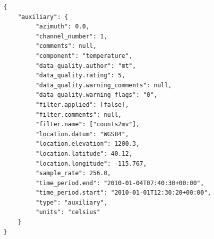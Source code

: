 \documentclass{article}
\begin{document}
\begin{verbatim}
{
    "auxiliary": {
         "azimuth": 0.0,
         "channel_number": 1,
         "comments": null,
         "component": "temperature",
         "data_quality.author": "mt",
         "data_quality.rating": 5,
         "data_quality.warning_comments": null,
         "data_quality.warning_flags": "0",
         "filter.applied": [false],
         "filter.comments": null,
         "filter.name": ["counts2mv"],
         "location.datum": "WGS84",
         "location.elevation": 1200.3,
         "location.latitude": 40.12,
         "location.longitude": -115.767,
         "sample_rate": 256.0,
         "time_period.end": "2010-01-04T07:40:30+00:00",
         "time_period.start": "2010-01-01T12:30:20+00:00",
         "type": "auxiliary",
         "units": "celsius"
    }
}
\end{verbatim}
\end{document}
